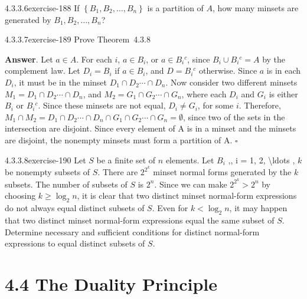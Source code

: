 \documentclass[twoside,10pt,]{book}
\numberwithin{equation}{section}
\begin{document}
\begin{divisionsolution}{4.3.3.6}{}{exercise-188}%
\hypertarget{p-1661}{}%
If \(\left\{B_1, B_2, \ldots , B_n\right\}\) is a partition of \(A\), how many minsets are generated by \(B_1, B_2, \ldots , B_n\)?%
\end{divisionsolution}%
\begin{divisionsolution}{4.3.3.7}{}{exercise-189}%
\hypertarget{p-1662}{}%
Prove Theorem~4.3.8%
\par\smallskip%
\noindent\textbf{Answer}.\quad%
\hypertarget{p-1663}{}%
Let \(a\in A\). For each \(i\), \(a\in B_i\), or \(a\in B_i{}^c\), since \(B_i\cup B_i{}^c=A\) by the complement law. Let \(D_i=B_i\) if \(a\in B_i\), and \(D=B_i{}^c\) otherwise. Since \(a\) is in each \(D_i\), it must be in the minset \(D_1\cap  D_2 \cdots \cap D_n\). Now consider two different minsets \(M_1= D_1\cap D_2\cdots \cap D_n\), and \(M_2=G_1\cap G_2\cdots \cap G_n\), where each \(D_i\) and \(G_i\) is either \(B_i\) or \(B_i{}^c\). Since these minsets are not equal, \(D_i\neq G_i\), for some \(i\). Therefore, \(M_1\cap M_2=D_1\cap  D_2 \cdots \cap D_n\cap G_1\cap G_2\cdots \cap G_n=\emptyset\), since two of the sets in the intersection are disjoint. Since every element of A is in a minset and the minsets are disjoint, the nonempty minsets must form a partition of A. \(\square\)%
\end{divisionsolution}%
\begin{divisionsolution}{4.3.3.8}{}{exercise-190}%
\hypertarget{p-1664}{}%
Let \(S\) be a finite set of \(n\) elements. Let \(B_i\) ,, i = 1, 2, \textbackslash{}ldots  , \(k\) be nonempty subsets of \(S\). There are \(2^{2^k}\) minset normal forms generated by the \(k\) subsets. The number of subsets of \(S\) is \(2^n\). Since we can make \(2^{2^k} > 2^n\) by choosing \(k \geq  \log _2 n\), it is clear that two distinct minset normal-form expressions do not always equal distinct subsets of \(S\). Even for \(k < \log _2 n\), it may happen that two distinct minset normal-form expressions equal the same subset of \(S\). Determine necessary and sufficient conditions for distinct normal-form expressions to equal distinct subsets of \(S\).%
\end{divisionsolution}%
\section*{4.4 The Duality Principle}
\end{document}
